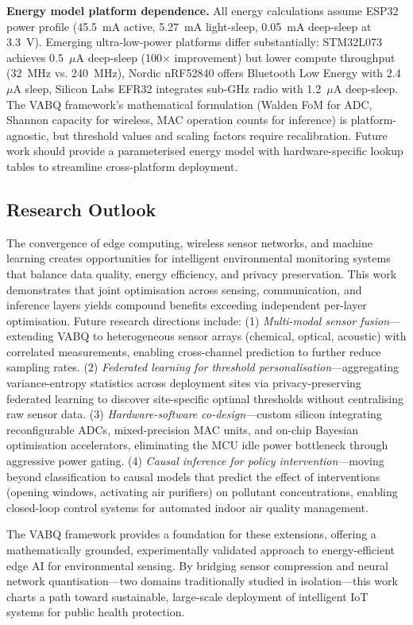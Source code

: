 \textbf{Energy model platform dependence.} All energy calculations assume ESP32 power profile (45.5~mA active, 5.27~mA light-sleep, 0.05~mA deep-sleep at 3.3~V). Emerging ultra-low-power platforms differ substantially: STM32L073 achieves 0.5~$\mu$A deep-sleep (100$\times$ improvement) but lower compute throughput (32~MHz vs. 240~MHz), Nordic nRF52840 offers Bluetooth Low Energy with 2.4~$\mu$A sleep, Silicon Labs EFR32 integrates sub-GHz radio with 1.2~$\mu$A deep-sleep. The VABQ framework's mathematical formulation (Walden FoM for ADC, Shannon capacity for wireless, MAC operation counts for inference) is platform-agnostic, but threshold values and scaling factors require recalibration. Future work should provide a parameterised energy model with hardware-specific lookup tables to streamline cross-platform deployment.

\subsection{Research Outlook}

The convergence of edge computing, wireless sensor networks, and machine learning creates opportunities for intelligent environmental monitoring systems that balance data quality, energy efficiency, and privacy preservation. This work demonstrates that joint optimisation across sensing, communication, and inference layers yields compound benefits exceeding independent per-layer optimisation. Future research directions include: (1) \emph{Multi-modal sensor fusion}---extending VABQ to heterogeneous sensor arrays (chemical, optical, acoustic) with correlated measurements, enabling cross-channel prediction to further reduce sampling rates. (2) \emph{Federated learning for threshold personalisation}---aggregating variance-entropy statistics across deployment sites via privacy-preserving federated learning to discover site-specific optimal thresholds without centralising raw sensor data. (3) \emph{Hardware-software co-design}---custom silicon integrating reconfigurable ADCs, mixed-precision MAC units, and on-chip Bayesian optimisation accelerators, eliminating the MCU idle power bottleneck through aggressive power gating. (4) \emph{Causal inference for policy intervention}---moving beyond classification to causal models that predict the effect of interventions (opening windows, activating air purifiers) on pollutant concentrations, enabling closed-loop control systems for automated indoor air quality management.

The VABQ framework provides a foundation for these extensions, offering a mathematically grounded, experimentally validated approach to energy-efficient edge AI for environmental sensing. By bridging sensor compression and neural network quantisation---two domains traditionally studied in isolation---this work charts a path toward sustainable, large-scale deployment of intelligent IoT systems for public health protection.

